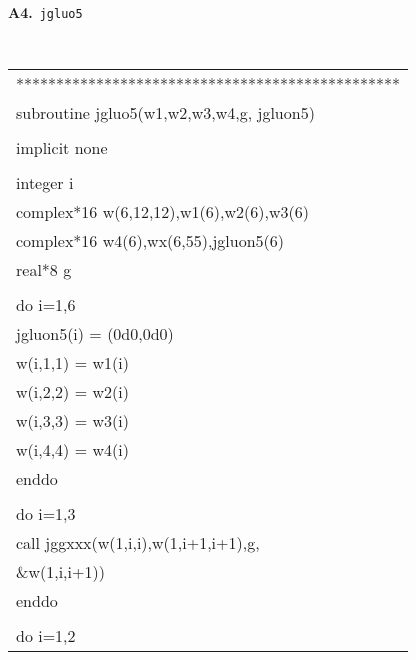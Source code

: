 \begin{center}
\vspace{1em}
{\bf A4.}~{\tt jgluo5}\\
{\tt
\begin{supertabular}{l}
************************************************\\
     \hspace{0.5em} subroutine jgluo5(w1,w2,w3,w4,g, jgluon5) \\
\\
     \hspace{0.5em} implicit none\\
\\
     \hspace{0.5em} integer i\\
     \hspace{0.5em} complex*16 w(6,12,12),w1(6),w2(6),w3(6)\\
     \hspace{0.5em} complex*16 w4(6),wx(6,55),jgluon5(6)   \\
     \hspace{0.5em} real*8 g\\
\\
     \hspace{0.5em} do i=1,6\\
     \hspace{1em}    jgluon5(i) = (0d0,0d0)\\
     \hspace{1em}    w(i,1,1) = w1(i)\\
     \hspace{1em}    w(i,2,2) = w2(i)\\
     \hspace{1em}    w(i,3,3) = w3(i)\\
     \hspace{1em}    w(i,4,4) = w4(i)\\
     \hspace{0.5em} enddo\\
     \\
      \hspace{0.5em} do i=1,3\\
      \hspace{1em}   call jggxxx(w(1,i,i),w(1,i+1,i+1),g,\\
      \&\hspace{7em}w(1,i,i+1))\\
      \hspace{0.5em} enddo\\
\\
       \hspace{0.5em} do i=1,2 \\

\end{supertabular}}
\end{center}
